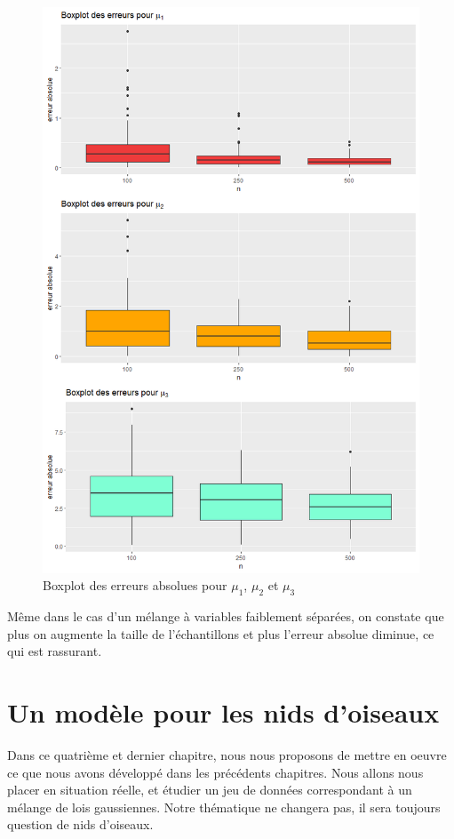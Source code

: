 \documentclass[frenchb]{report}
\newcommand{\1}{\mathbbm{1}}
\theoremstyle{definition}\newtheorem{defn}{Définition}
\theoremstyle{definition}\newtheorem{exm}{Exemple}
\theoremstyle{definition}\newtheorem{nota}{Notation}
\theoremstyle{definition}\newtheorem{rem}{Remarque}
\begin{document}
\begin{figure}[H]
	\centering
	\includegraphics[scale=0.5]{images/bad_mu.png}
	\caption{Boxplot des erreurs absolues pour $\mu_1$, $\mu_2$ et $\mu_3$}
\end{figure}
Même dans le cas d'un mélange à variables faiblement séparées, on constate que plus on augmente la taille de l'échantillons et plus l'erreur absolue diminue, ce qui est rassurant.



\chapter{Un modèle pour les nids d'oiseaux}

Dans ce quatrième et dernier chapitre, nous nous proposons de mettre en oeuvre ce que nous avons développé dans les précédents chapitres. Nous allons nous placer en situation réelle, et étudier un jeu de données correspondant à un mélange de lois gaussiennes. Notre thématique ne changera pas, il sera toujours question de nids d'oiseaux. 
\end{document}
